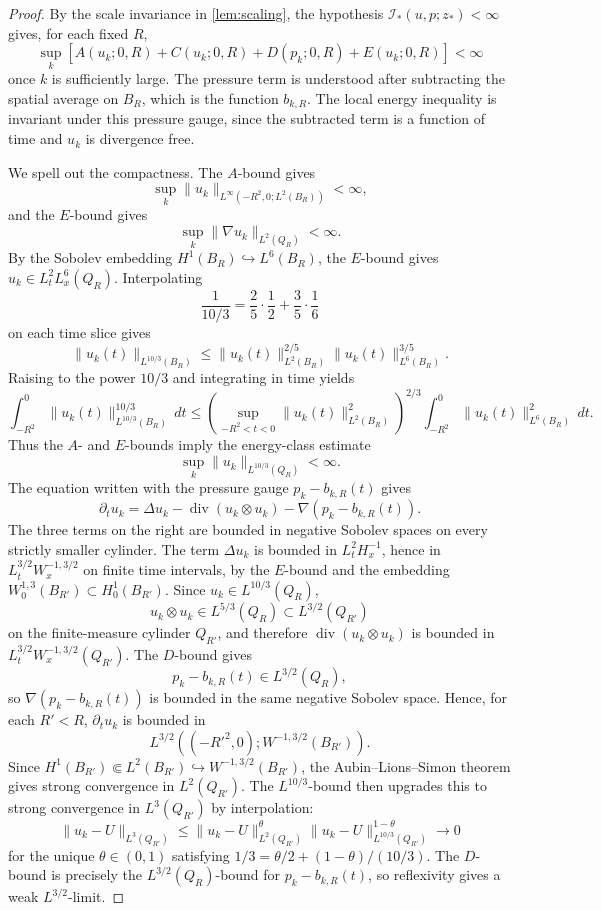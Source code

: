 \documentclass[11pt]{amsart}
\theoremstyle{plain}
\theoremstyle{definition}
\theoremstyle{remark}
\numberwithin{equation}{section}
\newcommand{\divergence}{\operatorname{div}}
\newcommand{\calI}{\mathcal I}
\begin{document}
\begin{proof}
By the scale invariance in \cref{lem:scaling}, the hypothesis
\(\calI_*(u,p;z_*)<\infty\) gives, for each fixed \(R\),
\[
   \sup_k\left[
   A(u_k;0,R)+C(u_k;0,R)+D(p_k;0,R)+E(u_k;0,R)
   \right]<\infty
\]
once \(k\) is sufficiently large.  The pressure term is understood after
subtracting the spatial average on \(B_R\), which is the function \(b_{k,R}\).
The local energy inequality is invariant under this pressure gauge, since the
subtracted term is a function of time and \(u_k\) is divergence free.

We spell out the compactness.  The \(A\)-bound gives
\[
   \sup_k\|u_k\|_{L^\infty(-R^2,0;L^2(B_R))}<\infty,
\]
and the \(E\)-bound gives
\[
   \sup_k\|\nabla u_k\|_{L^2(Q_R)}<\infty.
\]
By the Sobolev embedding \(H^1(B_R)\hookrightarrow L^6(B_R)\), the
\(E\)-bound gives \(u_k\in L^2_tL^6_x(Q_R)\).  Interpolating
\[
   \frac{1}{10/3}=\frac25\cdot\frac12+\frac35\cdot\frac16
\]
on each time slice gives
\[
   \|u_k(t)\|_{L^{10/3}(B_R)}
   \le
   \|u_k(t)\|_{L^2(B_R)}^{2/5}
   \|u_k(t)\|_{L^6(B_R)}^{3/5}.
\]
Raising to the power \(10/3\) and integrating in time yields
\[
   \int_{-R^2}^0\|u_k(t)\|_{L^{10/3}(B_R)}^{10/3}\,dt
   \le
   \left(\sup_{-R^2<t<0}\|u_k(t)\|_{L^2(B_R)}^2\right)^{2/3}
   \int_{-R^2}^0\|u_k(t)\|_{L^6(B_R)}^2\,dt .
\]
Thus the \(A\)- and \(E\)-bounds imply the energy-class estimate
\[
   \sup_k\|u_k\|_{L^{10/3}(Q_R)}<\infty.
\]
The equation written with the pressure gauge \(p_k-b_{k,R}(t)\) gives
\[
   \partial_tu_k
   =
   \Delta u_k-\divergence(u_k\otimes u_k)
   -\nabla(p_k-b_{k,R}(t)).
\]
The three terms on the right are bounded in negative Sobolev spaces on every
strictly smaller cylinder.  The term \(\Delta u_k\) is bounded in
\(L^2_tH^{-1}_x\), hence in
\(L^{3/2}_tW^{-1,3/2}_x\) on finite time intervals, by the \(E\)-bound and
the embedding \(W^{1,3}_0(B_{R'})\subset H^1_0(B_{R'})\).  Since
\(u_k\in L^{10/3}(Q_R)\),
\[
   u_k\otimes u_k\in L^{5/3}(Q_R)\subset L^{3/2}(Q_{R'})
\]
on the finite-measure cylinder \(Q_{R'}\), and therefore
\(\divergence(u_k\otimes u_k)\) is bounded in
\(L^{3/2}_tW^{-1,3/2}_x(Q_{R'})\).  The \(D\)-bound gives
\[
   p_k-b_{k,R}(t)\in L^{3/2}(Q_R),
\]
so \(\nabla(p_k-b_{k,R}(t))\) is bounded in the same negative Sobolev space.
Hence, for each \(R'<R\),
\(\partial_tu_k\) is bounded in
\[
   L^{3/2}((-R'^2,0);W^{-1,3/2}(B_{R'})).
\]
Since \(H^1(B_{R'})\Subset L^2(B_{R'})\hookrightarrow W^{-1,3/2}(B_{R'})\),
the Aubin--Lions--Simon theorem \cite{Aubin1963,LionsMagenes,Simon1987} gives
strong convergence in \(L^2(Q_{R'})\).
The \(L^{10/3}\)-bound then upgrades this to strong convergence in
\(L^3(Q_{R'})\) by interpolation:
\[
   \|u_k-U\|_{L^3(Q_{R'})}
   \le
   \|u_k-U\|_{L^2(Q_{R'})}^{\theta}
   \|u_k-U\|_{L^{10/3}(Q_{R'})}^{1-\theta}
   \to0
\]
for the unique \(\theta\in(0,1)\) satisfying
\(1/3=\theta/2+(1-\theta)/(10/3)\).  The \(D\)-bound is precisely the
\(L^{3/2}(Q_R)\)-bound for \(p_k-b_{k,R}(t)\), so reflexivity gives a weak
\(L^{3/2}\)-limit.


\end{proof}
\end{document}
